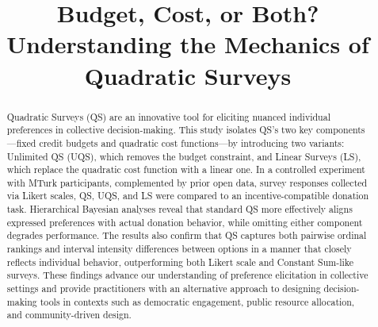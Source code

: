 \documentclass[manuscript, review, anonymous]{acmart}
\begin{document}

\title[Mechanics of Quadratic Surveys]{Budget, Cost, or Both? Understanding the Mechanics of Quadratic Surveys}








\renewcommand{\shortauthors}{Ti-Chung Cheng et al.}

\begin{abstract}
    Quadratic Surveys (QS) are an innovative tool for eliciting nuanced individual preferences in collective decision-making. This study isolates QS’s two key components—fixed credit budgets and quadratic cost functions—by introducing two variants: Unlimited QS (UQS), which removes the budget constraint, and Linear Surveys (LS), which replace the quadratic cost function with a linear one. In a controlled experiment with MTurk participants, complemented by prior open data, survey responses collected via Likert scales, QS, UQS, and LS were compared to an incentive-compatible donation task. Hierarchical Bayesian analyses reveal that standard QS more effectively aligns expressed preferences with actual donation behavior, while omitting either component degrades performance. The results also confirm that QS captures both pairwise ordinal rankings and interval intensity differences between options in a manner that closely reflects individual behavior, outperforming both Likert scale and Constant Sum-like surveys. These findings advance our understanding of preference elicitation in collective settings and provide practitioners with an alternative approach to designing decision-making tools in contexts such as democratic engagement, public resource allocation, and community-driven design.
\end{abstract}
\end{document}

